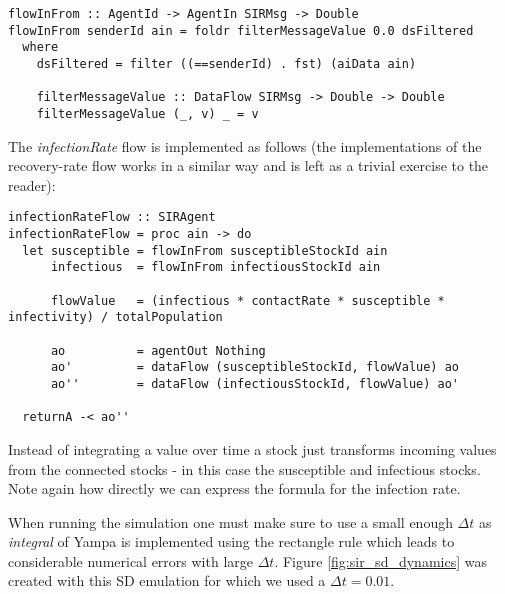 \begin{verbatim}
flowInFrom :: AgentId -> AgentIn SIRMsg -> Double
flowInFrom senderId ain = foldr filterMessageValue 0.0 dsFiltered
  where 
    dsFiltered = filter ((==senderId) . fst) (aiData ain)

    filterMessageValue :: DataFlow SIRMsg -> Double -> Double
    filterMessageValue (_, v) _ = v
\end{verbatim}
	
The \textit{infectionRate} flow is implemented as follows (the implementations of the recovery-rate flow works in a similar way and is left as a trivial exercise to the reader):

\begin{verbatim}
infectionRateFlow :: SIRAgent
infectionRateFlow = proc ain -> do
  let susceptible = flowInFrom susceptibleStockId ain 
      infectious  = flowInFrom infectiousStockId ain

      flowValue   = (infectious * contactRate * susceptible * infectivity) / totalPopulation
  
      ao          = agentOut Nothing
      ao'         = dataFlow (susceptibleStockId, flowValue) ao
      ao''        = dataFlow (infectiousStockId, flowValue) ao'
      
  returnA -< ao''
\end{verbatim}

Instead of integrating a value over time a stock just transforms incoming values from the connected stocks - in this case the susceptible and infectious stocks. Note again how directly we can express the formula for the infection rate.

When running the simulation one must make sure to use a small enough $\Delta t$ as \textit{integral} of Yampa is implemented using the rectangle rule which leads to considerable numerical errors with large $\Delta t$. Figure \ref{fig:sir_sd_dynamics} was created with this SD emulation for which we used a $\Delta t = 0.01$.

